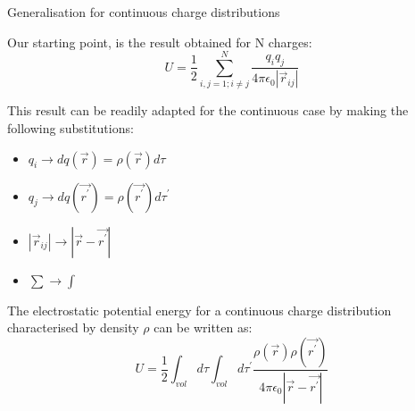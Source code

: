 %
%
%

\begin{frame}{Generalisation for continuous charge distributions}

Our starting point, is the result obtained for N charges:
\begin{equation*}
   U = \frac{1}{2} \sum_{i,j=1;i{\ne}j}^{N} \frac{q_i q_j}{4\pi\epsilon_0|\vec{r}_{ij}|}
\end{equation*}


This result can be readily adapted for the continuous case
by making the following substitutions:

\begin{itemize}
   \item $q_{i} \rightarrow dq(\vec{r}) = \rho(\vec{r}) d\tau$
   \item $q_{j} \rightarrow dq(\vec{r^{\prime}}) = \rho(\vec{r^{\prime}}) d\tau^{\prime}$
   \item $|\vec{r}_{ij}| \rightarrow |\vec{r} - \vec{r^{\prime}}|$
   \item $\sum \rightarrow \int$
\end{itemize}

The electrostatic potential energy for a continuous charge distribution characterised
by density $\rho$ can be written as:
\begin{equation*}
    U = \frac{1}{2} \int_{vol} d\tau \int_{vol} d\tau^{\prime}
          \frac{\rho(\vec{r}) \rho(\vec{r^{\prime}})}{4\pi\epsilon_0|\vec{r} - \vec{r^{\prime}}|}
\end{equation*}

\end{frame}


%
%
%


